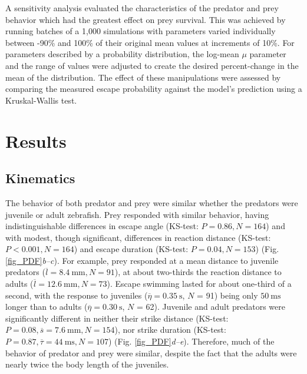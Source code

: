 \documentclass[]{rsos}%
\begin{document}
A sensitivity analysis evaluated the characteristics of the predator and prey behavior which had the greatest effect on prey survival. 
This was achieved by running batches of a 1,000 simulations with parameters varied individually between -90\% and 100\% of their original mean values at increments of 10\%.
For parameters described by a probability distribution, the log-mean $\mu$ parameter and the range of values were adjusted to create the desired percent-change in the mean of the distribution.
The effect of these manipulations were assessed by comparing the measured escape probability against the model's prediction using a Kruskal-Wallis test. 



\section{Results} %

\subsection{Kinematics} %
The behavior of both predator and prey were similar whether the predators were juvenile or adult zebrafish.
Prey responded with similar behavior, having indistinguishable differences in escape angle (KS-test: $P = 0.86, N = 164$) and with modest, though significant, differences in reaction distance (KS-test: $P < 0.001, N = 164$) and escape duration (KS-test: $P = 0.04, N = 153$) (Fig. \ref{fig_PDF}\textit{b--c}). 
For example, prey responded at a mean distance to juvenile predators ($\overline{l} = \SI{8.4}{\mm}, N = 91$), at about two-thirds the reaction distance to adults ($\overline{l} = \SI{12.6}{\mm}, N = 73$).
Escape swimming lasted for about one-third of a second, with the response to juveniles ($\overline{\eta} = \SI{0.35}{\s}$, $N$ = 91) being only  $\SI{50}{\ms}$ longer than to adults ($\overline{\eta} = \SI{0.30}{\s}$, $N$ = 62).
Juvenile and adult predators were significantly different in neither their strike distance (KS-test: $P = 0.08, \overline{s} = \SI{7.6}{\mm}, N = 154$), nor strike duration (KS-test: $P = 0.87, \overline{\tau} = \SI{44}{\ms}, N = 107$) (Fig. \ref{fig_PDF}\textit{d--e}).
Therefore, much of the behavior of predator and prey were similar, despite the fact that the adults were nearly twice the body length of the juveniles.
\end{document}
